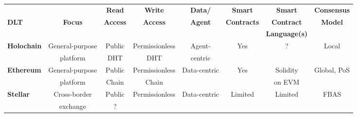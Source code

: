 \begin{table}
\small
\begin{centering}
{\begin{tabular}{| l | c | c | c | c | c | c | c |}
\hline
				& 				& \textbf{Read}			& \textbf{Write}		& \textbf{Data/} 
				& \textbf{Smart}		& \textbf{Smart}			&\textbf{Consensus}\\
\textbf{DLT}		&\textbf{Focus}  	& \textbf{Access} 		& \textbf{Access}	& \textbf{Agent} 
				& \textbf{Contracts} 	& \textbf{Contract}		&\textbf{Model} \\
				& 				& \textbf{} 				& \textbf{} 			& \textbf{} 
				& \textbf{} 			& \textbf{Language(s)}	&\textbf{}  \\
\hline
\hline
\textbf{Holochain}	&General-purpose 				&Public		&Permissionless	&Agent-	&Yes		&?
				&Local 				\\
				&platform 					&DHT		&DHT			&centric	&		&
				& 					\\
\hline
\textbf{Ethereum}	&General-purpose		&Public		&Permissionless	&Data-centric	&Yes		&Solidity	
				&Global, PoS 			 \\
				&platform 				&Chain		&Chain			&			&		&on EVM	
				& 					 \\
\hline
\textbf{Stellar}		&Cross-border 					&Public		&Permissionless	&Data-centric	&Limited	&Limited
				&FBAS 				\\
				&exchange 					&?			&				&			&		&
				& 					\\
\hline


\end{tabular}}
\end{centering}
\end{table}

